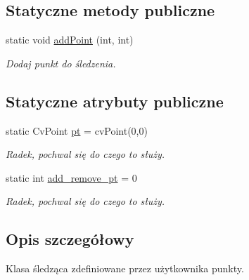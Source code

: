 \subsection*{Statyczne metody publiczne}
\begin{DoxyCompactItemize}
\item 
\hypertarget{class_points2_af00905a8a3803e51af17d1d3dbd7f33c}{
static void \hyperlink{class_points2_af00905a8a3803e51af17d1d3dbd7f33c}{addPoint} (int, int)}
\label{class_points2_af00905a8a3803e51af17d1d3dbd7f33c}

\begin{DoxyCompactList}\small\item\em Dodaj punkt do śledzenia. \item\end{DoxyCompactList}\end{DoxyCompactItemize}
\subsection*{Statyczne atrybuty publiczne}
\begin{DoxyCompactItemize}
\item 
\hypertarget{class_points2_a47f061a9802f8541f71ff3c805bd457f}{
static CvPoint \hyperlink{class_points2_a47f061a9802f8541f71ff3c805bd457f}{pt} = cvPoint(0,0)}
\label{class_points2_a47f061a9802f8541f71ff3c805bd457f}

\begin{DoxyCompactList}\small\item\em Radek, pochwal się do czego to służy. \item\end{DoxyCompactList}\item 
\hypertarget{class_points2_a27c9b3b569a0ac996490da0c6721408a}{
static int \hyperlink{class_points2_a27c9b3b569a0ac996490da0c6721408a}{add\_\-remove\_\-pt} = 0}
\label{class_points2_a27c9b3b569a0ac996490da0c6721408a}

\begin{DoxyCompactList}\small\item\em Radek, pochwal się do czego to służy. \item\end{DoxyCompactList}\end{DoxyCompactItemize}


\subsection{Opis szczegółowy}
Klasa śledząca zdefiniowane przez użytkownika punkty. 

